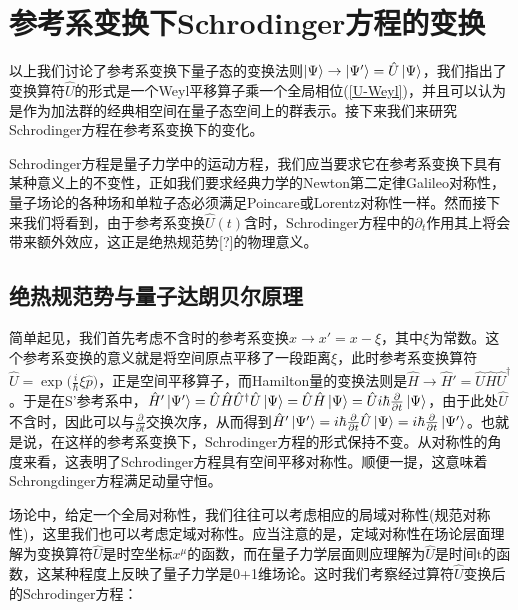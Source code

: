 \documentclass[a4paper]{article}
\begin{document}
    \section{参考系变换下Schrodinger方程的变换}

        以上我们讨论了参考系变换下量子态的变换法则$\ket{\Psi}\to\ket{\Psi'}=\hat{U}\ket{\Psi}$，我们指出了变换算符$\hat{U}$的形式是一个Weyl平移算子乘一个全局相位(\ref{U-Weyl})，并且可以认为是作为加法群的经典相空间在量子态空间上的群表示。接下来我们来研究Schrodinger方程在参考系变换下的变化。

        Schrodinger方程是量子力学中的运动方程，我们应当要求它在参考系变换下具有某种意义上的不变性，正如我们要求经典力学的Newton第二定律Galileo对称性，量子场论的各种场和单粒子态必须满足Poincare或Lorentz对称性一样。然而接下来我们将看到，由于参考系变换$\hat{U}(t)$含时，Schrodinger方程中的$\partial_t$作用其上将会带来额外效应，这正是绝热规范势[?]的物理意义。

    \subsection{绝热规范势与量子达朗贝尔原理}

        简单起见，我们首先考虑不含时的参考系变换$x\rightarrow x'=x-\xi$，其中$\xi$为常数。这个参考系变换的意义就是将空间原点平移了一段距离$\xi$，此时参考系变换算符$\hat{U}=\exp\big(\frac{i}{\hbar}\xi\hat{p} \big)$，正是空间平移算子，而Hamilton量的变换法则是$\hat{H}\rightarrow \hat{H}'=\hat{U}\hat{H}\hat{U}^\dagger$。于是在S'参考系中，$\hat{H}'\ket{\Psi'}=\hat{U}\hat{H}\hat{U}^\dagger\hat{U}\ket{\Psi}=\hat{U}\hat{H}\ket{\Psi}=\hat{U} i\hbar\frac{\partial}{\partial t}\ket{\Psi}$，由于此处$\hat{U}$不含时，因此可以与$\frac{\partial}{\partial t}$交换次序，从而得到$\hat{H}'\ket{\Psi'}=i\hbar\frac{\partial}{\partial t}\hat{U}\ket{\Psi}=i\hbar\frac{\partial}{\partial t}\ket{\Psi'}$。也就是说，在这样的参考系变换下，Schrodinger方程的形式保持不变。从对称性的角度来看，这表明了Schrodinger方程具有空间平移对称性。顺便一提，这意味着Schrongdinger方程满足动量守恒。

        场论中，给定一个全局对称性，我们往往可以考虑相应的局域对称性(规范对称性)，这里我们也可以考虑定域对称性。应当注意的是，定域对称性在场论层面理解为变换算符$\hat{U}$是时空坐标$x^\mu$的函数，而在量子力学层面则应理解为$\hat{U}$是时间t的函数，这某种程度上反映了量子力学是0+1维场论。这时我们考察经过算符$\hat{U}$变换后的Schrodinger方程：
\end{document}
